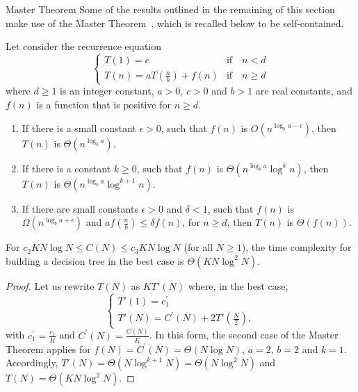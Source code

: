 \begin{remark}{Master Theorem}
Some of the results outlined in the remaining of this section make use of the
Master Theorem~\citep{bentley:1980,goodrich:2006}, which is recalled below to be self-contained.

\begin{theorem}
Let consider the recurrence equation
\begin{equation}
\begin{cases}
T(1) = c & \text{if}\quad n < d\\
T(n) = aT(\frac{n}{b}) + f(n) & \text{if}\quad n \geq d
\end{cases}
\end{equation}
where $d \geq 1$ is an integer constant, $a > 0$, $c>0$ and $b>1$ are real constants, and
$f(n)$ is a function that is positive for $n \geq d$.

\begin{enumerate}
\item If there is a small constant $\epsilon > 0$, such that $f(n)$ is $O(n^{\log_b a - \epsilon})$, then $T(n)$ is $\Theta(n^{\log_b a})$.
\item If there is a constant $k \geq 0$, such that $f(n)$ is $\Theta(n^{\log_b a} \log^k n)$, then $T(n)$ is $\Theta(n^{\log_b a} \log^{k+1} n)$.
\item If there are small constants $\epsilon > 0$ and $\delta < 1$, such that $f(n)$ is $\Omega(n^{\log_b a + \epsilon})$ and $af(\tfrac{n}{b}) \leq \delta f(n)$, for $n \geq d$, then $T(n)$ is $\Theta(f(n))$.
\end{enumerate}
\end{theorem}
\end{remark}

\pagebreak

\begin{theorem}\label{thm:6:best:knlogn}
For $c_2 KN\log N \leq C(N) \leq c_3 KN\log N$ (for all $N \geq 1$), the time complexity for building a decision
tree in the best case is $\Theta(K N \log^2 N)$.
\end{theorem}

\begin{proof}
Let us rewrite $T(N)$ as $K T'(N)$ where, in the best case,
\begin{equation}
\begin{cases}
T'(1) = c_1^\prime \\
T'(N) = C^\prime(N) + 2 T'(\frac{N}{2}),
\end{cases}
\end{equation}
with $c_1^\prime = \tfrac{c_1}{K}$ and $C^\prime(N)=\tfrac{C(N)}{K}$. In this form, the second case of the Master Theorem applies for
$f(N) = C^\prime(N)=\Theta(N\log N)$, $a=2$, $b=2$ and $k=1$. Accordingly, $T'(N)=\Theta(N\log^{k+1} N)=\Theta(N\log^2 N)$ and $T(N) = \Theta(K N\log^2 N)$.
\end{proof}

